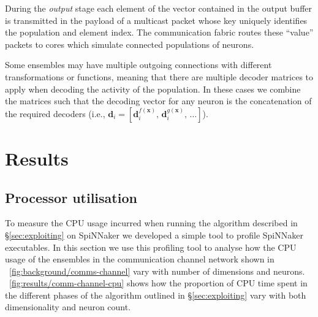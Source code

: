 \documentclass[conference]{IEEEtran}
\renewcommand{\vec}{\mathbf}  %
\begin{document}
  During the \textit{output} stage each element of the vector contained in the output buffer is transmitted in the payload of a multicast packet whose key uniquely identifies the population and element index.
  The communication fabric routes these ``value'' packets to cores which simulate connected populations of neurons.

  Some ensembles may have multiple outgoing connections with different transformations or functions, meaning that there are multiple decoder matrices to apply when decoding the activity of the population.
  In these cases we combine the matrices such that the decoding vector for any neuron is the concatenation of the required decoders
  (i.e., $\vec{d}_i = \left[\vec{d}_i^{f(\vec{x})},\,\vec{d}_i^{g(\vec{x})},\,\ldots \right]$).

  \section{Results}
  \label{sec:results}

  \subsection{Processor utilisation}
To measure the CPU usage incurred when running the algorithm described in \S\ref{sec:exploiting} on SpiNNaker we developed a simple tool to profile SpiNNaker executables.
In this section we use this profiling tool to analyse how the CPU usage of the ensembles in the communication channel network shown in \figurename~\ref{fig:background/comms-channel} vary with number of dimensions and neurons.
\figurename~\ref{fig:results/comm-channel-cpu} shows how the proportion of CPU time spent in the different phases of the algorithm outlined in \S\ref{sec:exploiting} vary with both dimensionality and neuron count.
\end{document}
